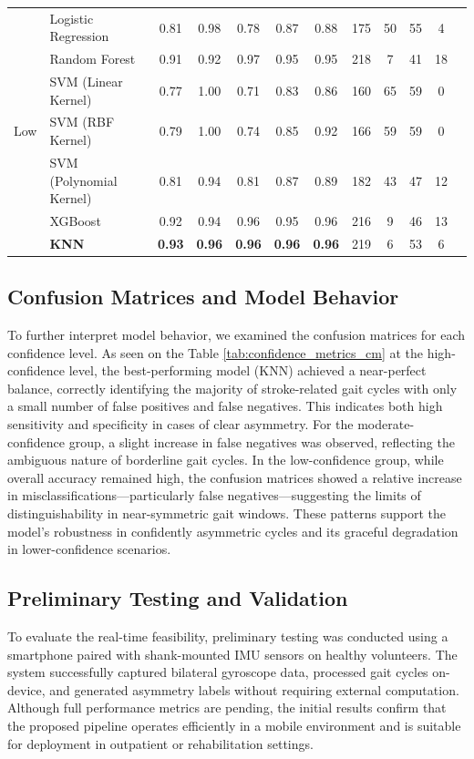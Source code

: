 \begin{table}
\begin{tabular}{llcccccccccc}
\midrule
\multirow{7}{*}{Low}
& Logistic Regression       & 0.81 & 0.98 & 0.78 & 0.87 & 0.88 & 175 & 50 & 55 & 4 \\
& Random Forest             & 0.91 & 0.92 & 0.97 & 0.95 & 0.95 & 218 & 7 & 41 & 18 \\
& SVM (Linear Kernel)       & 0.77 & 1.00 & 0.71 & 0.83 & 0.86 & 160 & 65 & 59 & 0 \\
& SVM (RBF Kernel)          & 0.79 & 1.00 & 0.74 & 0.85 & 0.92 & 166 & 59 & 59 & 0 \\
& SVM (Polynomial Kernel)   & 0.81 & 0.94 & 0.81 & 0.87 & 0.89 & 182 & 43 & 47 & 12 \\
& XGBoost                   & 0.92 & 0.94 & 0.96 & 0.95 & 0.96 & 216 & 9 & 46 & 13 \\
& \textbf{KNN}              & \textbf{0.93} & \textbf{0.96} & \textbf{0.96} & \textbf{0.96} & \textbf{0.96} & 219 & 6 & 53 & 6 \\

\bottomrule
\end{tabular}
\end{table}


\subsection{Confusion Matrices and Model Behavior}
To further interpret model behavior, we examined the confusion matrices for each confidence level. As seen on the Table \ref{tab:confidence_metrics_cm} at the 
high-confidence level, the best-performing model (KNN) achieved a near-perfect balance, correctly identifying the majority of stroke-related gait cycles with 
only a small number of false positives and false negatives. This indicates both high sensitivity and specificity in cases of clear asymmetry. For the 
moderate-confidence group, a slight increase in false negatives was observed, reflecting the ambiguous nature of borderline gait cycles. In the low-confidence group, 
while overall accuracy remained high, the confusion matrices showed a relative increase in misclassifications—particularly false negatives—suggesting the limits of 
distinguishability in near-symmetric gait windows. These patterns support the model's robustness in confidently asymmetric cycles and its graceful degradation 
in lower-confidence scenarios.


\subsection{Preliminary Testing and Validation}
To evaluate the real-time feasibility, preliminary testing was conducted using a smartphone paired with shank-mounted IMU sensors on healthy volunteers. 
The system successfully captured bilateral gyroscope data, processed gait cycles on-device, and generated asymmetry labels without requiring external 
computation. Although full performance metrics are pending, the initial results confirm that the proposed pipeline operates efficiently in a mobile environment 
and is suitable for deployment in outpatient or rehabilitation settings.
